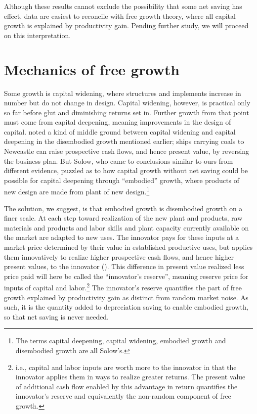 \documentclass[a4paper,fleqn]{latex_styles/cas-sc}
\begin{document}
Although these results cannot exclude the possibility that some net saving has effect, data are easiest to reconcile with free growth theory, where all capital growth is explained by productivity gain. Pending further study, we will proceed on this interpretation.

\hypertarget{mechanics-of-free-growth}{%
\section{Mechanics of free growth}\label{mechanics-of-free-growth}}

Some growth is capital widening, where structures and implements
increase in number but do not change in design. Capital widening,
however, is practical only so far before glut and diminishing returns
set in. Further growth from that point must come from capital deepening,
meaning improvements in the design of capital.
\citet{solowContributionTheoryEconomic1956a} noted a kind of middle
ground between capital widening and capital deepening in the disembodied
growth mentioned earlier; ships carrying coals to Newcastle can raise
prospective cash flows, and hence present value, by reversing the
business plan. But Solow, who came to conclusions similar to ours from
different evidence, puzzled as to how capital growth without net
saving could be possible for capital deepening through ``embodied''
growth, where products of new design are made from plant of new
design.\footnote{The terms capital deepening, capital widening, embodied
  growth and disembodied growth are all Solow's.}


The solution, we suggest, is that embodied growth is disembodied growth
on a finer scale. At each step toward realization of the new plant and
products, raw materials and products and labor skills and plant capacity
currently available on the market are adapted to new uses. The innovator
pays for these inputs at a market price determined by their value in
established productive uses, but applies them innovatively to realize
higher prospective cash flows, and hence higher present values, to the
innovator
(\citet{marshallPrinciplesEconomics1890, schumpeterTheoryEconomicDevelopment1934}).
This difference in present value realized less price paid will here be
called the ``innovator's reserve'', meaning reserve price for inputs of
capital and labor.\footnote{i.e., capital and labor inputs are worth
  more to the innovator in that the innovator applies them in ways to
  realize greater returns. The present value of additional cash flow
  enabled by this advantage in return quantifies the innovator's reserve
  and equivalently the non-random component of free growth.} The innovator's reserve quantifies the
part of free growth explained by productivity gain as distinct from
random market noise. As such, it is the quantity added to depreciation
saving to enable embodied growth, so that net saving is never
needed.
\end{document}
